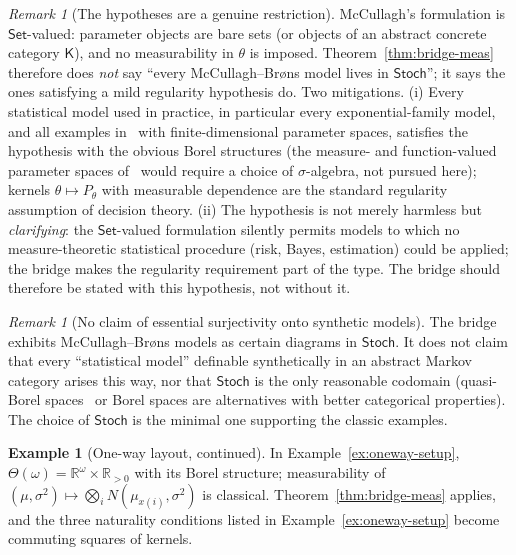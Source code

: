 \documentclass[11pt,a4paper]{article}
\theoremstyle{plain}
\theoremstyle{definition}
\newtheorem{example}[theorem]{Example}
\theoremstyle{remark}
\newtheorem{remark}[theorem]{Remark}
\newtheorem{caveat}[theorem]{Remark}
\newcommand{\cat}[1]{\mathsf{#1}}
\newcommand{\catK}{\cat{K}}
\newcommand{\Set}{\cat{Set}}
\newcommand{\Stoch}{\cat{Stoch}}
\newcommand{\R}{\mathbb{R}}
\begin{document}
\begin{remark}[The hypotheses are a genuine restriction]\label{rem:hypotheses}
McCullagh's formulation is $\Set$-valued: parameter objects are bare sets (or
objects of an abstract concrete category $\catK$), and no measurability in
$\theta$ is imposed. Theorem~\ref{thm:bridge-meas} therefore does \emph{not}
say ``every McCullagh--Br\o ns model lives in $\Stoch$''; it says the ones
satisfying a mild regularity hypothesis do. Two mitigations. (i) Every
statistical model used in practice, in particular every exponential-family
model, and all examples in~\cite{mccullagh_what_2002} with finite-dimensional
parameter spaces, satisfies the hypothesis with the obvious Borel structures
(the measure- and function-valued parameter spaces of~\cite[\S8]{mccullagh_what_2002}
would require a choice of $\sigma$-algebra, not pursued here); kernels $\theta \mapsto P_\theta$ with
measurable dependence are the standard regularity assumption of decision
theory. (ii) The hypothesis is not merely harmless but \emph{clarifying}: the
$\Set$-valued formulation silently permits models to which no measure-theoretic
statistical procedure (risk, Bayes, estimation) could be applied; the bridge
makes the regularity requirement part of the type. The bridge should
therefore be stated with this hypothesis, not without it.
\end{remark}

\begin{caveat}[No claim of essential surjectivity onto synthetic models]
The bridge exhibits McCullagh--Br\o ns models as certain diagrams in
$\Stoch$. It does not claim that every ``statistical model'' definable
synthetically in an abstract Markov category arises this way, nor that
$\Stoch$ is the only reasonable codomain (quasi-Borel spaces~\cite{heunen_convenient_2017}
or Borel spaces are alternatives with better categorical properties). The
choice of $\Stoch$ is the minimal one supporting the classic examples.
\end{caveat}

\begin{example}[One-way layout, continued]\label{ex:oneway-cont}
In Example~\ref{ex:oneway-setup}, $\Theta(\omega)=\R^\omega\times\R_{>0}$
with its Borel structure; measurability of
$(\mu,\sigma^2) \mapsto \bigotimes_i N(\mu_{x(i)},\sigma^2)$ is classical.
Theorem~\ref{thm:bridge-meas} applies, and the three naturality conditions
listed in Example~\ref{ex:oneway-setup} become commuting squares of kernels.
\end{example}
\end{document}

